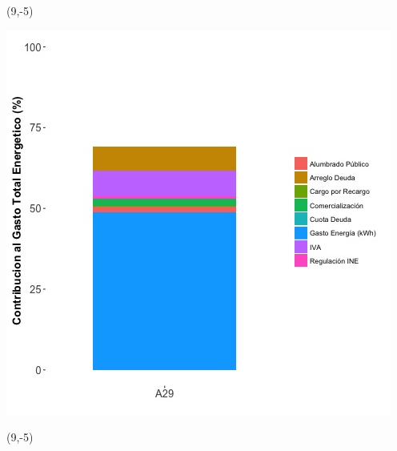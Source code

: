 \documentclass{article}\usepackage[]{graphicx}\usepackage[]{color}
\newenvironment{knitrout}{}{} %
\begin{document}
 \begin{textblock}{1}(9,-5)
\begin{minipage}{20em}
\begingroup

\endgroup
\end{minipage}
\end{textblock}

\begin{knitrout}
\color{fgcolor}
\includegraphics[scale=0.65]{figure/A29_costvars_plot.jpg} 
\end{knitrout}

 \begin{textblock}{1}(9,-5)
\begin{minipage}{20em}
\begingroup

\endgroup
\end{minipage}
\end{textblock}
\end{document}
